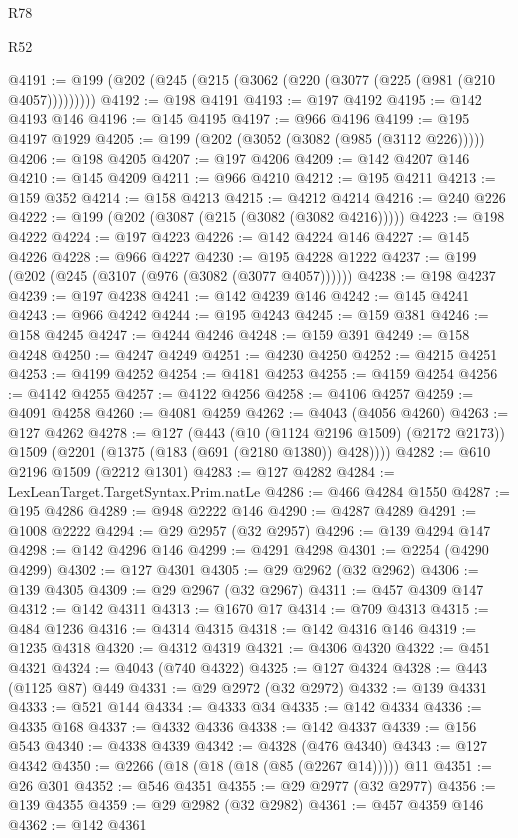 \begin{lexlean}{R78}
\begin{lexlean}{R52}
\begin{coremodule}
{{{{{{{{{{{{{{{{{{{{{{{{{{{{{{{{{{{{{{{{{{{{{{{{{{{{{{{{{{{{{{{{{{{{{{{{{{{{{{{{{{{{{{{{{{{{{{{{{{{{{{{{{{{{{{{{{{{{{{{{{{{{{{{{{{{{{{{{{{{{{{{{{{{{{{{{{{{{{{{{{{{{{{{{{{{{{{{{{{{{{{{{{{{{{{{{{{{{{{@4191 := @199 (@202 (@245 (@215 (@3062 (@220 (@3077 (@225 (@981 (@210 @4057)))))))))
@4192 := @198 @4191
@4193 := @197 @4192
@4195 := @142 @4193 @146
@4196 := @145 @4195
@4197 := @966 @4196
@4199 := @195 @4197 @1929
@4205 := @199 (@202 (@3052 (@3082 (@985 (@3112 @226)))))
@4206 := @198 @4205
@4207 := @197 @4206
@4209 := @142 @4207 @146
@4210 := @145 @4209
@4211 := @966 @4210
@4212 := @195 @4211
@4213 := @159 @352
@4214 := @158 @4213
@4215 := @4212 @4214
@4216 := @240 @226
@4222 := @199 (@202 (@3087 (@215 (@3082 (@3082 @4216)))))
@4223 := @198 @4222
@4224 := @197 @4223
@4226 := @142 @4224 @146
@4227 := @145 @4226
@4228 := @966 @4227
@4230 := @195 @4228 @1222
@4237 := @199 (@202 (@245 (@3107 (@976 (@3082 (@3077 @4057))))))
@4238 := @198 @4237
@4239 := @197 @4238
@4241 := @142 @4239 @146
@4242 := @145 @4241
@4243 := @966 @4242
@4244 := @195 @4243
@4245 := @159 @381
@4246 := @158 @4245
@4247 := @4244 @4246
@4248 := @159 @391
@4249 := @158 @4248
@4250 := @4247 @4249
@4251 := @4230 @4250
@4252 := @4215 @4251
@4253 := @4199 @4252
@4254 := @4181 @4253
@4255 := @4159 @4254
@4256 := @4142 @4255
@4257 := @4122 @4256
@4258 := @4106 @4257
@4259 := @4091 @4258
@4260 := @4081 @4259
@4262 := @4043 (@4056 @4260)
@4263 := @127 @4262
@4278 := @127
    (@443
      (@10 (@1124 @2196 @1509) (@2172 @2173))
      @1509
      (@2201 (@1375 (@183 (@691 (@2180 @1380)) @428))))
@4282 := @610 @2196 @1509 (@2212 @1301)
@4283 := @127 @4282
@4284 := LexLeanTarget.TargetSyntax.Prim.natLe
@4286 := @466 @4284 @1550
@4287 := @195 @4286
@4289 := @948 @2222 @146
@4290 := @4287 @4289
@4291 := @1008 @2222
@4294 := @29 @2957 (@32 @2957)
@4296 := @139 @4294 @147
@4298 := @142 @4296 @146
@4299 := @4291 @4298
@4301 := @2254 (@4290 @4299)
@4302 := @127 @4301
@4305 := @29 @2962 (@32 @2962)
@4306 := @139 @4305
@4309 := @29 @2967 (@32 @2967)
@4311 := @457 @4309 @147
@4312 := @142 @4311
@4313 := @1670 @17
@4314 := @709 @4313
@4315 := @484 @1236
@4316 := @4314 @4315
@4318 := @142 @4316 @146
@4319 := @1235 @4318
@4320 := @4312 @4319
@4321 := @4306 @4320
@4322 := @451 @4321
@4324 := @4043 (@740 @4322)
@4325 := @127 @4324
@4328 := @443 (@1125 @87) @449
@4331 := @29 @2972 (@32 @2972)
@4332 := @139 @4331
@4333 := @521 @144
@4334 := @4333 @34
@4335 := @142 @4334
@4336 := @4335 @168
@4337 := @4332 @4336
@4338 := @142 @4337
@4339 := @156 @543
@4340 := @4338 @4339
@4342 := @4328 (@476 @4340)
@4343 := @127 @4342
@4350 := @2266 (@18 (@18 (@18 (@85 (@2267 @14))))) @11
@4351 := @26 @301
@4352 := @546 @4351
@4355 := @29 @2977 (@32 @2977)
@4356 := @139 @4355
@4359 := @29 @2982 (@32 @2982)
@4361 := @457 @4359 @146
@4362 := @142 @4361
}}}}}}}}}}}}}}}}}}}}}}}}}}}}}}}}}}}}}}}}}}}}}}}}}}}}}}}}}}}}}}}}}}}}}}}}}}}}}}}}}}}}}}}}}}}}}}}}}}}}}}}}}}}}}}}}}}}}}}}}}}}}}}}}}}}}}}}}}}}}}}}}}}}}}}}}}}}}}}}}}}}}}}}}}}}}}}}}}}}}}}}}}}}}}}}}}}}}}}
\end{coremodule}
\end{lexlean}
\end{lexlean}
